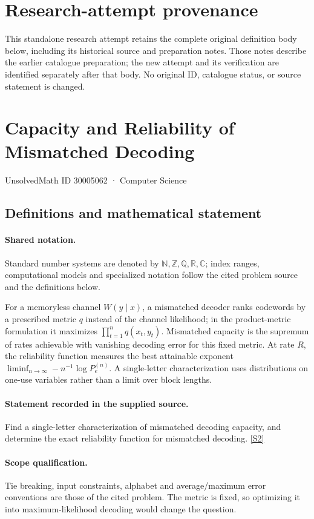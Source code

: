 \documentclass[11pt]{article}
\begin{document}
\section*{Research-attempt provenance}
This standalone research attempt retains the complete original definition body below,
including its historical source and preparation notes. Those notes describe the
earlier catalogue preparation; the new attempt and its verification are identified
separately after that body. No original ID, catalogue status, or source statement is changed.

\section{Capacity and Reliability of Mismatched Decoding}\label{30005062}
{\small UnsolvedMath ID 30005062 · Computer Science}
\subsection{Definitions and mathematical statement}

\paragraph{Shared notation.}Standard number systems are denoted by $\mathbb N,\mathbb Z,\mathbb Q,\mathbb R,\mathbb C$; index ranges, computational models and specialized notation follow the cited problem source and the definitions below.


For a memoryless channel $W(y\mid x)$, a mismatched decoder ranks codewords by a prescribed metric $q$ instead of the channel likelihood; in the product-metric formulation it maximizes $\prod_{t=1}^n q(x_t,y_t)$. Mismatched capacity is the supremum of rates achievable with vanishing decoding error for this fixed metric. At rate $R$, the reliability function measures the best attainable exponent $\liminf_{n\to\infty}-n^{-1}\log P_e^{(n)}$. A single-letter characterization uses distributions on one-use variables rather than a limit over block lengths.
\paragraph{Statement recorded in the supplied source.}
Find a single-letter characterization of mismatched decoding capacity, and determine the exact reliability function for mismatched decoding. \href{https://doi.org/10.4171/owr/2022/14}{[S2]}
\paragraph{Scope qualification.}
Tie breaking, input constraints, alphabet and average/maximum error conventions are those of the cited problem. The metric is fixed, so optimizing it into maximum-likelihood decoding would change the question.
\end{document}
